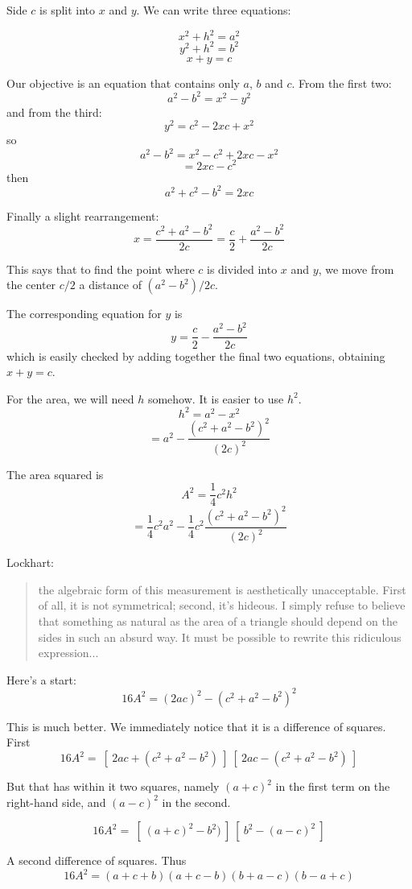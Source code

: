 \documentclass[11pt, oneside]{article}
\begin{document}
Side $c$ is split into $x$ and $y$.  We can write three equations:

\[ x^2 + h^2 = a^2 \]
\[ y^2 + h^2 = b^2 \]
\[ x + y = c \]

Our objective is an equation that contains only $a$, $b$ and $c$.  From the first two:
\[ a^2 - b^2 = x^2 - y^2 \]
and from the third:
\[ y^2 = c^2 - 2xc + x^2 \]
so
\[ a^2 - b^2 = x^2 - c^2 + 2xc - x^2 \]
\[ = 2xc - c^2 \]
then
\[ a^2 + c^2 - b^2 = 2xc \]

Finally a slight rearrangement:
\[ x = \frac{c^2 + a^2-b^2}{2c} = \frac{c}{2} + \frac{a^2-b^2}{2c}   \]

This says that to find the point where $c$ is divided into $x$ and $y$, we move from the center $c/2$ a distance of $(a^2 - b^2)/2c$.

The corresponding equation for $y$ is
\[ y = \frac{c}{2} - \frac{a^2-b^2}{2c} \]
which is easily checked by adding together the final two equations, obtaining $x + y = c$.

For the area, we will need $h$ somehow.  It is easier to use $h^2$.
\[ h^2 = a^2 - x^2 \]
\[ = a^2 - \frac{(c^2 + a^2-b^2)^2}{(2c)^2}  \]

The area squared is
\[ A^2 = \frac{1}{4}c^2 h^2 \]
\[ = \frac{1}{4} c^2 a^2 - \frac{1}{4} c^2 \frac{(c^2 + a^2-b^2)^2}{(2c)^2}  \]

Lockhart:

\begin{quote}
the algebraic form of this measurement is aesthetically unacceptable. First of all, it is not symmetrical; second, it's hideous. I simply refuse to believe that something as natural as the area of a triangle should depend on the sides in such an absurd way. It must be possible to rewrite this ridiculous expression...
\end{quote}

Here's a start:
\[ 16A^2 = (2ac)^2 - (c^2 + a^2-b^2)^2 \]

This is much better.  We immediately notice that it is a difference of squares.  First
\[ 16A^2 = \ [ \ 2ac + (c^2 + a^2-b^2) \ ] \ [ \ 2ac - (c^2 + a^2-b^2) \ ]  \]

But that has within it two squares, namely $(a + c)^2$ in the first term on the right-hand side, and $(a - c)^2$ in the second.

\[ 16A^2 = \ [ \ (a + c)^2 -b^2) \ ] \ [ \ b^2 - (a - c)^2 \ ]  \]

A second difference of squares.  Thus
\[ 16A^2 =  (a + c + b)(a + c - b)(b + a - c)(b - a + c) \]
\end{document}
